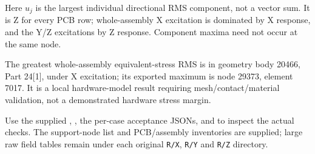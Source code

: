 \documentclass[10pt,a4paper]{article}
\begin{document}
Here $u_j$ is the largest individual directional RMS component, not a vector sum. It is Z for every PCB row; whole-assembly X excitation is dominated by X response, and the Y/Z excitations by Z response. Component maxima need not occur at the same node.

The greatest whole-assembly equivalent-stress RMS is in geometry body 20466, Part 24[1], under X excitation; its exported maximum is node 29373, element 7017. It is a local hardware-model result requiring mesh/contact/material validation, not a demonstrated hardware stress margin.

Use the supplied , , the per-case acceptance JSONs,  and  to inspect the actual checks. The support-node list and PCB/assembly inventories are supplied; large raw field tables remain under each original \texttt{R/X}, \texttt{R/Y} and \texttt{R/Z} directory.
\end{document}
